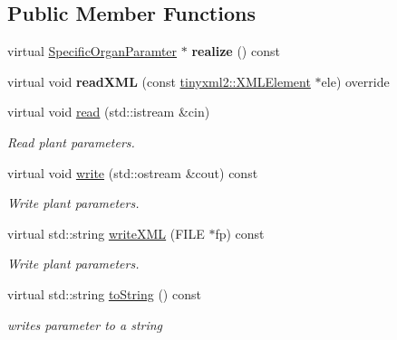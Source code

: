 \subsection*{Public Member Functions}
\begin{DoxyCompactItemize}
\item 
\mbox{\label{classCPlantBox_1_1SeedRandomOrganParameter_add77869534066d71f8a63b1eb2b286bc}} 
virtual \hyperlink{classCPlantBox_1_1SpecificOrganParamter}{Specific\+Organ\+Paramter} $\ast$ {\bfseries realize} () const
\item 
\mbox{\label{classCPlantBox_1_1SeedRandomOrganParameter_a16cd6d49f9e64b2d73388863a3cacdd2}} 
virtual void {\bfseries read\+X\+ML} (const \hyperlink{classCPlantBox_1_1tinyxml2_1_1XMLElement}{tinyxml2\+::\+X\+M\+L\+Element} $\ast$ele) override
\item 
\mbox{\label{classCPlantBox_1_1SeedRandomOrganParameter_abc210ae118e8c703ffb1561ed7a09368}} 
virtual void \hyperlink{classCPlantBox_1_1SeedRandomOrganParameter_abc210ae118e8c703ffb1561ed7a09368}{read} (std\+::istream \&cin)
\begin{DoxyCompactList}\small\item\em Read plant parameters. \end{DoxyCompactList}\item 
\mbox{\label{classCPlantBox_1_1SeedRandomOrganParameter_ad2d3568f9d0e837649c9e38e10e62305}} 
virtual void \hyperlink{classCPlantBox_1_1SeedRandomOrganParameter_ad2d3568f9d0e837649c9e38e10e62305}{write} (std\+::ostream \&cout) const
\begin{DoxyCompactList}\small\item\em Write plant parameters. \end{DoxyCompactList}\item 
\mbox{\label{classCPlantBox_1_1SeedRandomOrganParameter_af5c06459ae86995b0a214dbf74c5dd5a}} 
virtual std\+::string \hyperlink{classCPlantBox_1_1SeedRandomOrganParameter_af5c06459ae86995b0a214dbf74c5dd5a}{write\+X\+ML} (F\+I\+LE $\ast$fp) const
\begin{DoxyCompactList}\small\item\em Write plant parameters. \end{DoxyCompactList}\item 
\mbox{\label{classCPlantBox_1_1SeedRandomOrganParameter_ad774e5f4f56f800e00d0957bd9248c62}} 
virtual std\+::string \hyperlink{classCPlantBox_1_1SeedRandomOrganParameter_ad774e5f4f56f800e00d0957bd9248c62}{to\+String} () const
\begin{DoxyCompactList}\small\item\em writes parameter to a string \end{DoxyCompactList}\end{DoxyCompactItemize}
